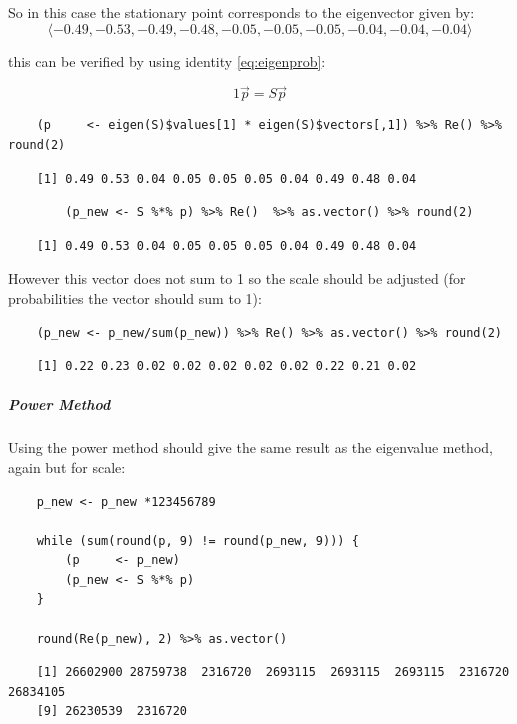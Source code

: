 \documentclass[11pt]{report}
\begin{document}
So in this case the stationary point corresponds to the eigenvector given by:
\[
\langle -0.49, -0.53, -0.49, -0.48, -0.05, -0.05, -0.05, -0.04, -0.04, -0.04 \rangle
\]

this can be verified by using identity \eqref{eq:eigenprob}:

$$
1 \vec{p} = S\vec{p}
$$

\begin{tcolorbox}
    \begin{verbatim}
    (p     <- eigen(S)$values[1] * eigen(S)$vectors[,1]) %>% Re() %>%  round(2)
    \end{verbatim}
\tcblower
    \begin{verbatim}
    [1] 0.49 0.53 0.04 0.05 0.05 0.05 0.04 0.49 0.48 0.04
    \end{verbatim}
\end{tcolorbox}

\begin{tcolorbox}
    \begin{verbatim}
        (p_new <- S %*% p) %>% Re()  %>% as.vector() %>% round(2)
    \end{verbatim}
 \tcblower
    \begin{verbatim}
    [1] 0.49 0.53 0.04 0.05 0.05 0.05 0.04 0.49 0.48 0.04
    \end{verbatim}
\end{tcolorbox}


However this vector does not sum to 1 so the scale should be adjusted
(for probabilities the vector should sum to 1):

\begin{tcolorbox}
    \begin{verbatim}
    (p_new <- p_new/sum(p_new)) %>% Re() %>% as.vector() %>% round(2)
    \end{verbatim}
\tcblower
    \begin{verbatim}
    [1] 0.22 0.23 0.02 0.02 0.02 0.02 0.02 0.22 0.21 0.02
    \end{verbatim}
\end{tcolorbox}

\subparagraph{Power Method}
\label{power-value-method}
Using the power method should give the same result as the eigenvalue method, again but for scale:

\begin{tcolorbox}
    \begin{verbatim}
    p_new <- p_new *123456789

    while (sum(round(p, 9) != round(p_new, 9))) {
        (p     <- p_new)
        (p_new <- S %*% p)
    }

    round(Re(p_new), 2) %>% as.vector()
    \end{verbatim}
\tcblower
    \begin{verbatim}
    [1] 26602900 28759738  2316720  2693115  2693115  2693115  2316720 26834105
    [9] 26230539  2316720
    \end{verbatim}
\end{tcolorbox}
\end{document}
